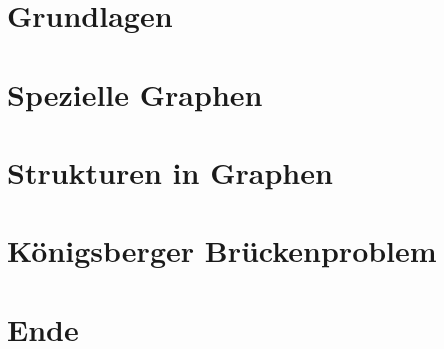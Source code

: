 \documentclass[hyperref={pdfpagelabels=false},usepdftitle=false]{beamer}
\begin{document}
\title{\titleText}
\subtitle{}
\author{\tutor}
\date{2. Juli 2013}
\subject{Diskrete Mathematik}

\frame{\titlepage}


\section{Grundlagen}


\section{Spezielle Graphen}


\section{Strukturen in Graphen}


\section{Königsberger Brückenproblem}


\section{Ende}

\end{document}
